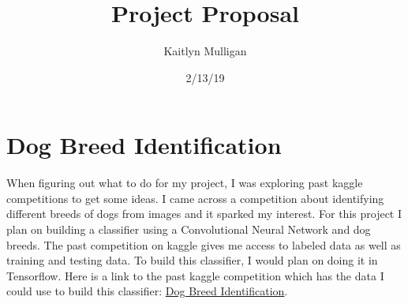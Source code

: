 \documentclass[a4paper]{article}
\title{Project Proposal}
\author{Kaitlyn Mulligan}
\date{2/13/19}
\begin{document}
\lstset{language=Python}

\maketitle

\section{Dog Breed Identification}
When figuring out what to do for my project, I was exploring past kaggle 
competitions to get some ideas.  I came across a competition about identifying 
different breeds of dogs from images and it sparked my interest.  For this project 
I plan on building a classifier using a Convolutional Neural Network and dog 
breeds.  The past competition on kaggle gives me access to labeled data as well 
as training and testing data.  To build this classifier, I would plan on doing it 
in Tensorflow.  Here is a link to the past kaggle competition which has the data I 
could use to build this classifier: \href{https://www.kaggle.com/c/dog-breed-identification}
{Dog Breed Identification}.
\end{document}
